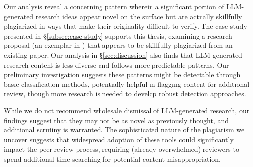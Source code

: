 Our analysis reveal a concerning pattern
wherein a significant portion of LLM-generated research ideas
appear novel on the surface
but are actually skillfully plagiarized
in ways that make their originality difficult to verify.
The case study presented in \S\ref{subsec:case-study} supports this thesis, examining a research proposal (an exemplar in \citep{si2024can}) that appears to be skillfully plagiarized from an existing paper.
Our analysis in \S\ref{sec:discussion} also 
finds that LLM-generated research content 
is less diverse 
and 
follows more predictable patterns. 
Our preliminary investigation suggests these patterns might be detectable through basic classification methods, potentially helpful in flagging content for additional review, though more research is needed to develop robust detection approaches.


While we do not recommend wholesale dismissal of LLM-generated research,
our findings suggest that they  
may not be as novel as 
previously thought, and additional scrutiny is warranted.
The sophisticated nature of the plagiarism
we uncover suggests 
that widespread adoption of these tools 
could significantly impact the peer review process, 
requiring (already overwhelmed) reviewers 
to spend additional time searching 
for potential content misappropriation. 



